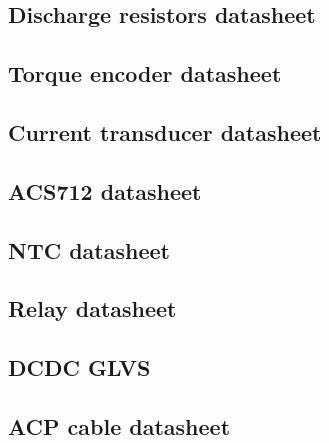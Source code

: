 
\subsection{Discharge resistors datasheet}\label{app:discharge_resistor_sheet}
	

\subsection{Torque encoder datasheet}\label{app:torque_encoder_datasheet}
	

\subsection{Current transducer datasheet}\label{app:bspd_lem_datasheet}
	

\subsection{ACS712 datasheet}\label{app:acs712_datasheet}
	

\subsection{NTC datasheet}\label{app:ntc_datasheet}
	

\subsection{Relay datasheet}\label{app:precharge_relay_datasheet}
	
	
\subsection{DCDC GLVS}\label{app:glvs_dcdc}
	

\subsection{ACP cable datasheet}\label{app:PowerConductor}
	

\label{app:XT60connector}
